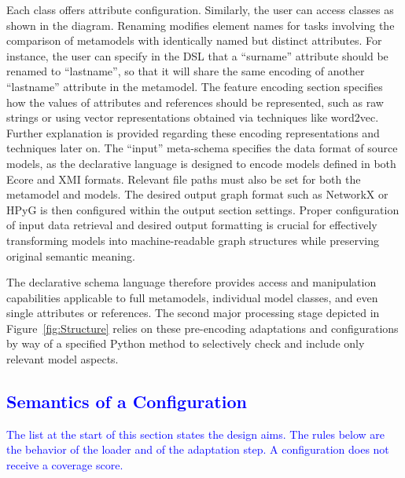 \documentclass[journal,article,submit,moreauthors,technologies]{Definitions/mdpi}
\newcommand{\rev}[1]{\textcolor{blue}{#1}}
\begin{document}
Each class offers attribute configuration. Similarly, the user can access classes as shown in the diagram. Renaming modifies element names for tasks involving the comparison of metamodels with identically named but distinct attributes. For instance, the user can specify in the DSL that a ``surname'' attribute should be renamed to ``lastname'', so that it will share the same encoding of another ``lastname'' attribute in the metamodel.
The feature encoding section specifies how the values of attributes and references should be represented, such as raw strings or using vector representations obtained via techniques like word2vec. Further explanation is provided regarding these encoding representations and techniques later on. The ``input'' meta-schema specifies the data format of source models, as the declarative language is designed to encode models defined in both Ecore and XMI formats. Relevant file paths must also be set for both the metamodel and models. The desired output graph format such as NetworkX or HPyG is then configured within the output section settings. Proper configuration of input data retrieval and desired output formatting is crucial for effectively transforming models into machine-readable graph structures while preserving original semantic meaning.

The declarative schema language therefore provides access and manipulation capabilities applicable to full metamodels, individual model classes, and even single attributes or references. The second major processing stage depicted in Figure~\ref{fig:Structure} relies on these pre-encoding adaptations and configurations by way of a specified Python method to selectively check and include only relevant model aspects.

\subsection{\rev{Semantics of a Configuration}}\label{sec:semantics}
\rev{The list at the start of this section states the design aims. The rules below are the behavior of the loader and of the adaptation step. A configuration does not receive a coverage score.}
\end{document}
